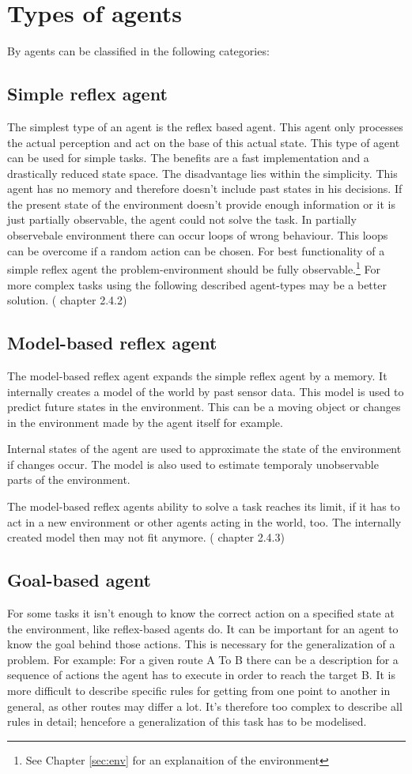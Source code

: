 \documentclass[10pt,a4paper,DIV=11]{scrreprt}
\begin{document}
\section{Types of agents}
By \cite{ai} agents can be classified in the following categories:
\subsection{Simple reflex agent}
The simplest type of an agent is the reflex based agent.
This agent only processes the actual perception and act on the base of this actual state. This type of agent can be used for simple tasks. The benefits are a fast implementation and a drastically reduced state space.
The disadvantage lies within the simplicity. This agent has no memory and therefore doesn't include past states in his decisions. If the present state of the environment doesn't provide enough information or it is just partially observable, the agent could not solve the task.
In partially observebale environment there can occur loops of wrong behaviour. This loops can be overcome if a random action can be chosen.
For best functionality of a simple reflex agent the problem-environment should be fully observable.\footnote{See Chapter \ref{sec:env} for an explanaition of the environment}
For more complex tasks using the following described agent-types may be a better solution.
(\cite{ai} chapter 2.4.2)
\subsection{Model-based reflex agent}
The model-based reflex agent expands the simple reflex agent by a memory. It internally creates a model of the world by past sensor data. This model is used to predict future states in the environment.
This can be a moving object or changes in the environment made by the agent itself for example.

Internal states of the agent are used to approximate the state of the environment if changes occur. 
The model is also used to estimate temporaly unobservable parts of the environment.

The model-based reflex agents ability to solve a task reaches its limit, if it has to act in a new environment or other agents acting in the world, too. The internally created model then may not fit anymore.
(\cite{ai} chapter 2.4.3)

\subsection{Goal-based agent}
For some tasks it isn't enough to know the correct action on a specified state at the environment, like reflex-based agents do. It can be important for an agent to know the goal behind those actions. This is necessary for the generalization of a problem. For example: For a given route A To B there can be a description for a sequence of actions the agent has to execute in order to reach the target B. It is more difficult to describe specific rules for getting from one point to another in general, as other routes may differ a lot. It's therefore too complex to describe all rules in detail; hencefore a generalization of this task has to be modelised.
\end{document}

